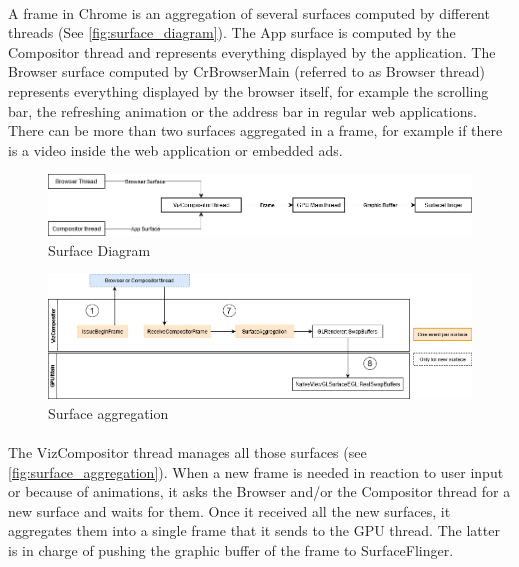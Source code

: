 \documentclass{kththesis}
\begin{document}
\paragraph{}
A frame in Chrome is an aggregation of several surfaces computed by different threads (See \autoref{fig:surface_diagram}). The App surface is computed by the Compositor thread and represents everything displayed by the application. The Browser surface computed by CrBrowserMain (referred to as Browser thread) represents everything displayed by the browser itself, for example the scrolling bar, the refreshing animation or the address bar in regular web applications. There can be more than two surfaces aggregated in a frame, for example if there is a video inside the web application or embedded ads.

\begin{figure}[h]
    \centering
    \includegraphics[width=13cm]{kththesis/Figures/surface_diagram.png}
    \caption{Surface Diagram}
    \label{fig:surface_diagram}
\end{figure}

\begin{figure}[h]
    \centering
    \includegraphics[width=\linewidth]{kththesis/Figures/Surface_aggregation.png}
    \caption{Surface aggregation}
    \label{fig:surface_aggregation}
\end{figure}

\paragraph{}
The VizCompositor thread manages all those surfaces (see \autoref{fig:surface_aggregation}). When a new frame is needed in reaction to user input or because of animations, it asks the Browser and/or the Compositor thread for a new surface and waits for them. Once it received all the new surfaces, it aggregates them into a single frame that it sends to the GPU thread. The latter is in charge of pushing the graphic buffer of the frame to SurfaceFlinger. 
\end{document}

